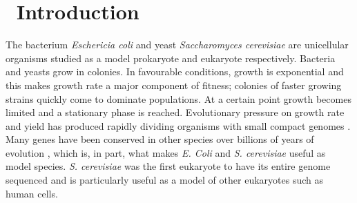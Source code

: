 \graphicspath{{images/}}

\section{\thesection~Introduction}
\label{sec:introduction}

The bacterium \textit{Eschericia coli} and yeast \textit{Saccharomyces
  cerevisiae} are unicellular organisms studied as a model prokaryote
and eukaryote respectively. Bacteria and yeasts grow in colonies. In
favourable conditions, growth is exponential and this makes growth
rate a major component of fitness; colonies of faster growing strains
quickly come to dominate populations. At a certain point growth
becomes limited and a stationary phase is reached.
Evolutionary pressure on growth rate and yield has produced rapidly
dividing organisms with small compact genomes
\citep{dethlefsen2007performance,giovannoni2014implications}. Many
genes have been conserved in other species over billions of years of
evolution \citep{OBrien2005inparanoid}, which is, in part, what makes
\textit{E. Coli} and \textit{S. cerevisiae} useful as model species.
\textit{S. cerevisiae} was the first eukaryote to have its entire
genome sequenced \citep{goffeau1996life} and is particularly useful as
a model of other eukaryotes such as human cells.



